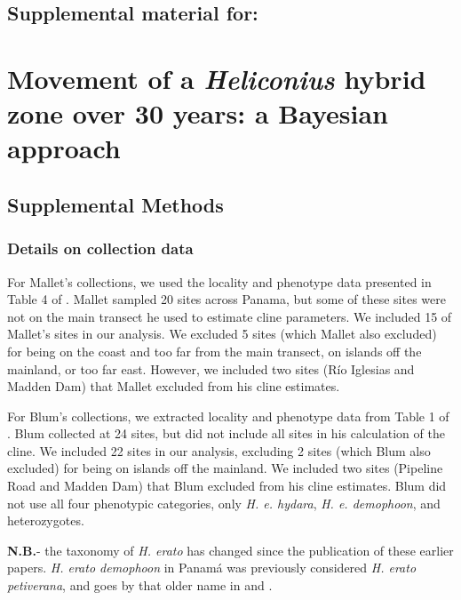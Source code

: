 \documentclass[]{article}
\title{}
\author{}
\date{}
\begin{document}
\subsection{Supplemental material for:}

\section{\texorpdfstring{Movement of a \textit{Heliconius} hybrid zone
over 30 years: a Bayesian
approach}{Movement of a  hybrid zone over 30 years: a Bayesian approach}}\label{movement-of-a-hybrid-zone-over-30-years-a-bayesian-approach}

\subsection{Supplemental Methods}\label{supplemental-methods}

\subsubsection{Details on collection
data}\label{details-on-collection-data}

For Mallet's collections, we used the locality and phenotype data
presented in Table 4 of \citet{Mallet:1986vj}. Mallet sampled 20 sites
across Panama, but some of these sites were not on the main transect he
used to estimate cline parameters. We included 15 of Mallet's sites in
our analysis. We excluded 5 sites (which Mallet also excluded) for being
on the coast and too far from the main transect, on islands off the
mainland, or too far east. However, we included two sites (Río Iglesias
and Madden Dam) that Mallet excluded from his cline estimates.

For Blum's collections, we extracted locality and phenotype data from
Table 1 of \citet{Blum:2002wr}. Blum collected at 24 sites, but did not
include all sites in his calculation of the cline. We included 22 sites
in our analysis, excluding 2 sites (which Blum also excluded) for being
on islands off the mainland. We included two sites (Pipeline Road and
Madden Dam) that Blum excluded from his cline estimates. Blum did not
use all four phenotypic categories, only \textit{H. e. hydara},
\textit{H. e. demophoon}, and heterozygotes.

\textbf{N.B.}- the taxonomy of \textit{H. erato} has changed since the
publication of these earlier papers. \textit{H. erato demophoon} in
Panamá was previously considered \textit{H. erato petiverana}, and goes
by that older name in \citet{Mallet:1986vj} and \citet{Blum:2002wr}.
\end{document}
